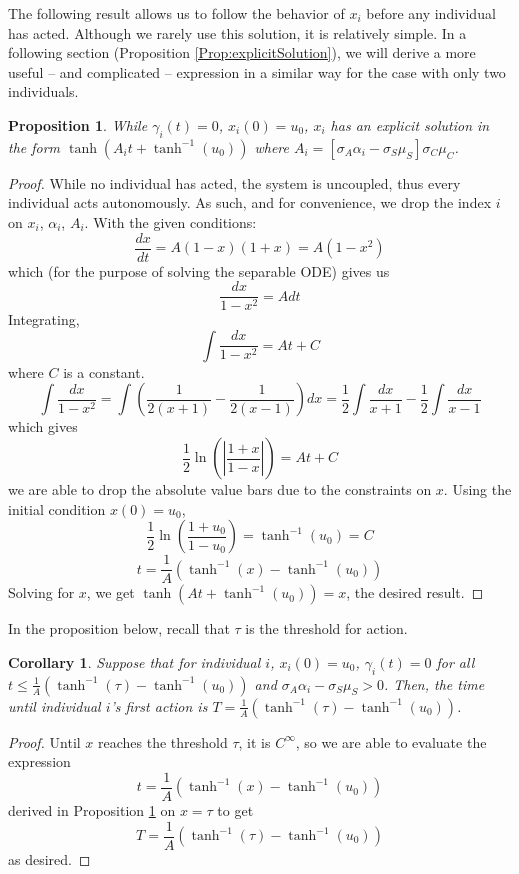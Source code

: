 \documentclass[preprint,12pt]{elsarticle}
\newcommand{\lt}{\left}
\newcommand{\rt}{\right}
\newtheorem{prop}{Proposition}
\newtheorem{cor}{Corollary}
\begin{document}
The following result allows us to follow the behavior of $x_i$ before any individual has acted. Although we rarely use this solution, it is relatively simple. In a following section (Proposition \ref{Prop:explicitSolution}), we will derive a more useful -- and complicated -- expression in a similar way for the case with only two individuals.
\begin{prop}\label{PROP:beforeNudgeSolution}
    While $\gamma_i(t) = 0$, $x_i(0) = u_0$, $x_i$ has an explicit solution in the form
    $\tanh(A_it + \tanh^{-1}(u_0))$ where $A_i = [\sigma_A \alpha_i - \sigma_S \mu_S]\sigma_C\mu_C$.
\end{prop}
\begin{proof} While no individual has acted, the system is uncoupled, thus every individual acts autonomously. As such, and for convenience, we drop the index $i$ on $x_i$, $\alpha_i$, $A_i$. With the given conditions: \[
\frac{dx}{dt} = A(1-x)(1+x) = A(1-x^2)\] which (for the purpose of solving the separable ODE) gives us
\[\frac{dx}{1-x^2} = Adt
\]
Integrating,
\[ \int \frac{dx}{1-x^2} = At + C\]
where $C$ is a constant.
\[
\int \frac{dx}{1-x^2} = \int \lt(\frac{1}{2(x+1)}  - \frac{1}{2(x-1)} \rt)dx = \frac{1}{2}\int \frac{dx}{x+1} - \frac{1}{2}\int \frac{dx}{x-1}
\]
which gives
\[\frac{1}{2}\ln\lt(\lt|\frac{1+x}{1-x}\rt|\rt) = At + C\]
we are able to drop the absolute value bars due to the constraints on $x$. Using the initial condition $x(0) = u_0$, \[
\frac{1}{2}\ln\lt(\frac{1+u_0}{1-u_0}\rt) = \tanh^{-1}(u_0) = C
\] \[
   t  =  \frac{1}{A}( \tanh^{-1}(x) - \tanh^{-1}(u_0))
\]
Solving for $x$, we get $\tanh(At + \tanh^{-1}(u_0)) = x$, the desired result. \end{proof}

In the proposition below, recall that $\tau$ is the threshold for action.
\begin{cor}\label{period}
    Suppose that for individual $i$, $x_i(0) = u_0$, $\gamma_i(t) = 0$ for all $t \leq \frac{1}{A}( \tanh^{-1}(\tau) - \tanh^{-1}(u_0))$ and $\sigma_A\alpha_i - \sigma_S\mu_S > 0$.  Then, the time until individual $i$'s first action is $T = \frac{1}{A}( \tanh^{-1}(\tau) - \tanh^{-1}(u_0))$.
\end{cor}
\begin{proof}
Until $x$ reaches the threshold $\tau$, it is $C^\infty$, so we are able to evaluate the expression \[
t = \frac{1}{A}( \tanh^{-1}(x) - \tanh^{-1}(u_0))
\] derived in Proposition \ref{PROP:beforeNudgeSolution} on $x = \tau$ to get \[
T = \frac{1}{A}( \tanh^{-1}(\tau) - \tanh^{-1}(u_0))
\]
as desired. \end{proof}
\end{document}

